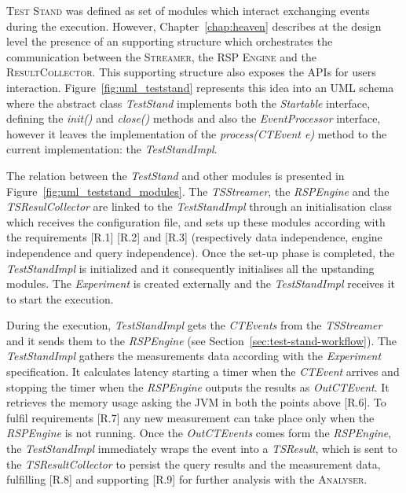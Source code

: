 \noindent \name \textsc{Test Stand} was defined as set of modules which interact exchanging events during the execution. However, Chapter~\ref{chap:heaven} describes at the design level the presence of an supporting structure which orchestrates the communication between the \textsc{Streamer}, the \textsc{RSP Engine} and the \textsc{ResultCollector}. This supporting structure also exposes the APIs for users interaction. Figure~\ref{fig:uml_teststand} represents this idea into an UML schema where the abstract class \textit{TestStand} implements both the \textit{Startable} interface, defining the \textit{init()} and \textit{close()} methods and also the \textit{EventProcessor} interface, however it leaves the implementation of the \textit{process(CTEvent e)} method to the current implementation: the \textit{TestStandImpl}. 

The relation between the \textit{TestStand} and other modules is presented in Figure~\ref{fig:uml_teststand_modules}. The \textit{TSStreamer}, the \textit{RSPEngine} and the \textit{TSResulCollector} are linked to the \textit{TestStandImpl} through an initialisation class which receives the configuration file, and sets up these modules according with the requirements [R.1]  [R.2] and [R.3] (respectively data independence, engine independence and query independence). Once the set-up phase is completed, the \textit{TestStandImpl} is initialized and it consequently initialises all the upstanding modules. The \textit{Experiment} is created externally and  the \textit{TestStandImpl} receives it to start the execution. 

During the execution, \textit{TestStandImpl} gets the \textit{CTEvents} from the \textit{TSStreamer} and it sends them to the \textit{RSPEngine} (see Section~\ref{sec:test-stand-workflow}). The \textit{TestStandImpl} gathers the measurements data according with the \textit{Experiment} specification. It calculates latency starting a timer when the \textit{CTEvent} arrives and stopping the timer when the \textit{RSPEngine} outputs the results as \textit{OutCTEvent}. It retrieves the memory usage asking the JVM in both the points above [R.6]. To fulfil requirements [R.7] any new measurement can take place only when the \textit{RSPEngine} is not running. Once the \textit{OutCTEvents} comes form the \textit{RSPEngine}, the \textit{TestStandImpl} immediately wraps the event into a \textit{TSResult}, which is sent to the \textit{TSResultCollector} to persist the query results and the measurement data, fulfilling [R.8] and supporting [R.9] for further analysis with the \textsc{Analyser}.

